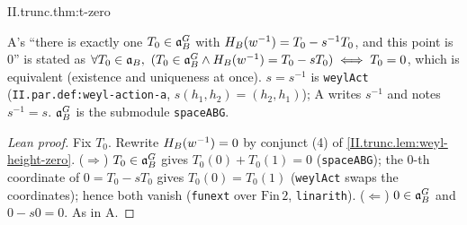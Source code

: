 \begin{theorem}[$T_0=0$]
\end{theorem}
\begin{tfformal}{II.trunc.thm:t-zero}
\begin{tffidelity}
A's ``there is exactly one $T_0\in\mathfrak{a}_B^G$ with $H_B(w^{-1})=T_0-s^{-1}T_0$, and this point is $0$'' is stated as $\forall T_0\in\aB,\ (T_0\in\aBG\wedge\HB(w^{-1})=T_0-sT_0)\iff T_0=0$, which is equivalent (existence and uniqueness at once). $s=s^{-1}$ is \texttt{weylAct} (\texttt{II.par.def:weyl-action-a}, $s(h_1,h_2)=(h_2,h_1)$); A writes $s^{-1}$ and notes $s^{-1}=s$. $\mathfrak{a}_B^G$ is the submodule \texttt{spaceABG}.
\end{tffidelity}
\end{tfformal}
\begin{proof}[Lean proof]
Fix $T_0$. Rewrite $H_B(w^{-1})=0$ by conjunct (4) of \cref{II.trunc.lem:weyl-height-zero}. ($\Rightarrow$) $T_0\in\mathfrak{a}_B^G$ gives $T_0(0)+T_0(1)=0$ (\texttt{spaceABG}); the $0$-th coordinate of $0=T_0-sT_0$ gives $T_0(0)=T_0(1)$ (\texttt{weylAct} swaps the coordinates); hence both vanish (\texttt{funext} over $\mathrm{Fin}\,2$, \texttt{linarith}). ($\Leftarrow$) $0\in\mathfrak{a}_B^G$ and $0-s0=0$. As in A.
\end{proof}

